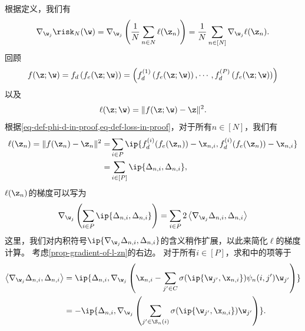 \begin{myproof}
根据定义，我们有
\begin{equation} \label{eq-prop-gradient-nabla-R-N}
    \nabla_{\w_j} \risk_N(\w) 
    = \nabla_{\w_j} \left( \frac{1}{N} \sum_{n \in N} \ell(\z_n) \right) 
    = \frac{1}{N} \sum_{n \in [N]} \nabla_{\w_j} \ell(\z_n).
\end{equation}
回顾
\begin{equation}\label{eq-def-phi-d-in-proof}
f(\z;\w) = f_d \left(f_e(\z;\w) \right)
= \left( f_d^{(1)} \left(f_e(\z;\w) \right) , \cdots , f_d^{(P)}\left(f_e(\z;\w) \right) \right)
\end{equation}
以及
\begin{equation}\label{eq-def-loss-in-proof}
    \ell(\z;\w) = \| f(\z;\w) - \z \|^2.
\end{equation}
根据\cref{eq-def-phi-d-in-proof,eq-def-loss-in-proof}，对于所有$ n \in [N]$，我们有
\begin{equation}
    \begin{aligned}
        \ell(\z_n) 
        = \| f(\z_n) - \z_n \|^2
        = & \sum_{i \in P}   \ip{ f_d^{(i)}(f_e(\z_n)) -\x_{n,i}, f_d^{(i)}(f_e(\z_n)) -\x_{n,i}} \\
        = & \sum_{i \in [P]} \ip{\Delta_{n,i},\Delta_{n,i}},
    \end{aligned}
\end{equation}
$\ell(\z_n)$的梯度可以写为
\begin{equation} \label{prop-gradient-of-l-zn}
    \nabla_{\w_j} \left( \sum_{i \in P} \ip{\Delta_{n,i},\Delta_{n,i}} \right) 
    = \sum_{i \in P} 2 \left\langle \nabla_{\w_j}\Delta_{n,i}, \Delta_{n,i} \right\rangle
\end{equation}
这里，我们对内积符号$\ip{\nabla_{\w_j}\Delta_{n,i}, \Delta_{n,i}}$的含义稍作扩展，以此来简化$\ell$的梯度计算。
考虑\cref{prop-gradient-of-l-zn}的右边。
对于所有$ i \in [P]$，求和中的项等于
\begin{equation}\label{eq-prop-gradient-2nabla-delta}
\begin{aligned}
    \left\langle \nabla_{\w_j}\Delta_{n,i}, \Delta_{n,i} \right\rangle
    &= \ip{\Delta_{n,i} , \nabla_{\w_j} \left( \x_{n,i} -  \sum_{{j^{\prime}} \in C} \sigma(\ip{\w_{j^{\prime}},\x_{n,i}}) \psi_n(i,{j^{\prime}}) \w_{j^{\prime}} \right) } \\
    &= - \ip{\Delta_{n,i} , \nabla_{\w_j} \left( \sum_{{j^{\prime}} \in \S_{n}(i)} \sigma(\ip{\w_{j^{\prime}},\x_{n,i}}) \w_{j^{\prime}} \right) }.
\end{aligned}

\end{equation}
\end{myproof}
